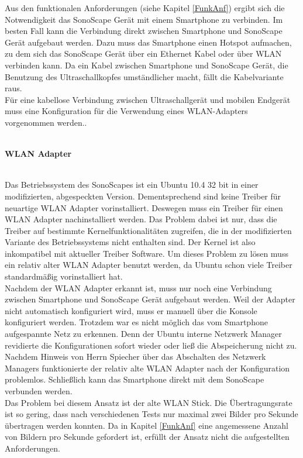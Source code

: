 Aus den funktionalen Anforderungen (siehe Kapitel \ref{FunkAnf}) ergibt sich die Notwendigkeit das SonoScape Gerät mit einem Smartphone zu verbinden. Im besten Fall kann die Verbindung direkt zwischen Smartphone und SonoScape Gerät aufgebaut werden. Dazu muss das Smartphone einen Hotspot aufmachen, zu dem sich das SonoScape Gerät über ein Ethernet Kabel oder über WLAN verbinden kann. Da ein Kabel zwischen Smartphone und SonoScape Gerät, die Benutzung des Ultraschallkopfes umständlicher macht, fällt die Kabelvariante raus.\\
Für eine kabellose Verbindung zwischen Ultraschallgerät und mobilen Endgerät muss eine Konfiguration für die Verwendung eines WLAN-Adapters vorgenommen werden..\\\\
\begin{large}
\textbf{WLAN Adapter}\\\\
\end{large}
Das Betriebssystem des SonoScapes ist ein Ubuntu 10.4 32 bit in einer modifizierten, abgespeckten Version. Dementsprechend sind keine Treiber für neuartige WLAN Adapter vorinstalliert. Deswegen muss ein Treiber für einen WLAN Adapter nachinstalliert werden. Das Problem dabei ist nur, dass die Treiber auf bestimmte Kernelfunktionalitäten zugreifen, die in der modifizierten Variante des Betriebssystems nicht enthalten sind. Der Kernel ist also inkompatibel mit aktueller Treiber Software. Um dieses Problem zu lösen muss ein relativ alter WLAN Adapter benutzt werden, da Ubuntu schon viele Treiber standardmäßig vorinstalliert hat. \\
Nachdem der WLAN Adapter erkannt ist, muss nur noch eine Verbindung zwischen Smartphone und SonoScape Gerät aufgebaut werden. Weil der Adapter nicht automatisch konfiguriert wird, muss er manuell über die Konsole konfiguriert werden. Trotzdem war es nicht möglich das vom Smartphone aufgespannte Netz zu erkennen. Denn der Ubuntu interne Netzwerk Manager revidierte die Konfigurationen sofort wieder oder ließ die Abspeicherung nicht zu. Nachdem Hinweis von Herrn Spiecher über das Abschalten des Netzwerk Managers funktionierte der relativ alte WLAN Adapter nach der Konfiguration problemlos. Schließlich kann das Smartphone direkt mit dem SonoScape verbunden werden.\\
Das Problem bei diesem Ansatz ist der alte WLAN Stick. Die Übertragungsrate ist so gering, dass nach verschiedenen Tests nur maximal zwei Bilder pro Sekunde übertragen werden konnten. Da in Kapitel \ref{FunkAnf} eine angemessene Anzahl von Bildern pro Sekunde gefordert ist, erfüllt der Ansatz nicht die aufgestellten Anforderungen.\\\\
